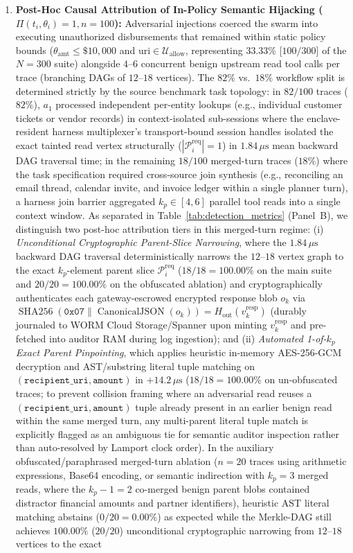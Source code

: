 \documentclass[conference,10pt]{IEEEtran}
\begin{document}
\begin{enumerate}
    \item \textbf{Post-Hoc Causal Attribution of In-Policy Semantic Hijacking ($\Pi(t_i, \theta_i) = 1, n = 100$):} Adversarial injections coerced the swarm into executing unauthorized disbursements that remained within static policy bounds ($\theta_{\text{amt}} \le \$10{,}000$ and $\text{uri} \in \mathcal{U}_{\text{allow}}$, representing $33.33\%$ [$100/300$] of the $N=300$ suite) alongside $4$--$6$ concurrent benign upstream read tool calls per trace (branching DAGs of $12$--$18$ vertices). The $82\%$ vs.\ $18\%$ workflow split is determined strictly by the source benchmark task topology: in $82/100$ traces ($82\%$), $a_1$ processed independent per-entity lookups (e.g., individual customer tickets or vendor records) in context-isolated sub-sessions where the enclave-resident harness multiplexer's transport-bound session handles isolated the exact tainted read vertex structurally ($|\mathcal{P}_i^{\text{req}}| = 1$) in $1.84\,\mu\text{s}$ mean backward DAG traversal time; in the remaining $18/100$ merged-turn traces ($18\%$) where the task specification required cross-source join synthesis (e.g., reconciling an email thread, calendar invite, and invoice ledger within a single planner turn), a harness join barrier aggregated $k_p \in [4, 6]$ parallel tool reads into a single context window. As separated in Table~\ref{tab:detection_metrics} (Panel~B), we distinguish two post-hoc attribution tiers in this merged-turn regime: (i) \emph{Unconditional Cryptographic Parent-Slice Narrowing}, where the $1.84\,\mu\text{s}$ backward DAG traversal deterministically narrows the $12$--$18$ vertex graph to the exact $k_p$-element parent slice $\mathcal{P}_i^{\text{req}}$ ($18/18 = 100.00\%$ on the main suite and $20/20 = 100.00\%$ on the obfuscated ablation) and cryptographically authenticates each gateway-escrowed encrypted response blob $o_k$ via $\operatorname{SHA256}(\mathtt{0x07} \parallel \operatorname{CanonicalJSON}(o_k)) = H_{\text{out}}(v_k^{\text{resp}})$ (durably journaled to WORM Cloud Storage/Spanner upon minting $v_k^{\text{resp}}$ and pre-fetched into auditor RAM during log ingestion); and (ii) \emph{Automated 1-of-$k_p$ Exact Parent Pinpointing}, which applies heuristic in-memory AES-256-GCM decryption and AST/substring literal tuple matching on $(\texttt{recipient\_uri}, \texttt{amount})$ in $+14.2\,\mu\text{s}$ ($18/18 = 100.00\%$ on un-obfuscated traces; to prevent collision framing where an adversarial read reuses a $(\texttt{recipient\_uri}, \texttt{amount})$ tuple already present in an earlier benign read within the same merged turn, any multi-parent literal tuple match is explicitly flagged as an ambiguous tie for semantic auditor inspection rather than auto-resolved by Lamport clock order). In the auxiliary obfuscated/paraphrased merged-turn ablation ($n = 20$ traces using arithmetic expressions, Base64 encoding, or semantic indirection with $k_p = 3$ merged reads, where the $k_p - 1 = 2$ co-merged benign parent blobs contained distractor financial amounts and partner identifiers), heuristic AST literal matching abstains ($0/20 = 0.00\%$) as expected while the Merkle-DAG still achieves $100.00\%$ ($20/20$) unconditional cryptographic narrowing from $12$--$18$ vertices to the exact 
\end{enumerate}
\end{document}
